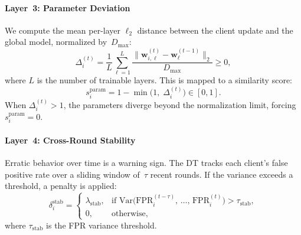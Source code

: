 \documentclass[conference]{IEEEtran}
\begin{document}
\paragraph{Layer~3: Parameter Deviation} We compute the mean per-layer $\ell_2$ distance between the client update and the global model, normalized by~$D_{\max}$:
\begin{equation}
    \Delta_i^{(t)} = \frac{1}{L}\sum_{\ell=1}^{L}\frac{\|\mathbf{w}_{i,\ell}^{(t)} - \mathbf{w}_{\ell}^{(t-1)}\|_2}{D_{\max}} \ge 0,
\label{eq:param-dist}
\end{equation}
where $L$ is the number of trainable layers. This is mapped to a similarity score:
\begin{equation}
    s_i^{\text{param}} = 1 - \min\bigl(1,\; \Delta_i^{(t)}\bigr) \in [0,1].
\label{eq:param}
\end{equation}
When $\Delta_i^{(t)} > 1$, the parameters diverge beyond the normalization limit, forcing $s_i^{\text{param}} = 0$.

\paragraph{Layer~4: Cross-Round Stability} Erratic behavior over time is a warning sign. The DT tracks each client's false positive rate over a sliding window of~$\tau$ recent rounds. If the variance exceeds a threshold, a penalty is applied:
\begin{equation}
    \delta_i^{\text{stab}} =
    \begin{cases}
        \lambda_{\text{stab}}, & \text{if } \mathrm{Var}\!\bigl(\text{FPR}_i^{(t{-}\tau)},\, \dots,\, \text{FPR}_i^{(t)}\bigr) > \tau_{\text{stab}}, \\
        0, & \text{otherwise},
    \end{cases}
\label{eq:stab}
\end{equation}
where $\tau_{\text{stab}}$ is the FPR variance threshold.
\end{document}
